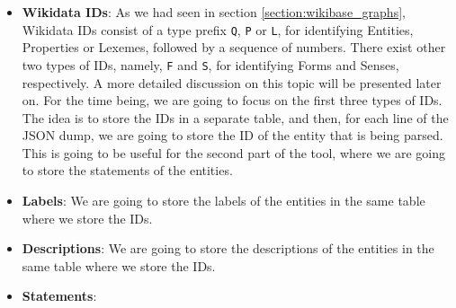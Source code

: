 \begin{itemize}
    \itemsep0.5em
    \item \textbf{Wikidata IDs}: As we had seen in section \ref{section:wikibase_graphs}, Wikidata IDs consist of a type prefix \texttt{Q}, \texttt{P} or \texttt{L}, for identifying Entities, Properties or Lexemes, followed by a sequence of numbers. There exist other two types of IDs, namely, \texttt{F} and \texttt{S}, for identifying Forms and Senses, respectively. A more detailed discussion on this topic will be presented later on. For the time being, we are going to focus on the first three types of IDs. The idea is to store the IDs in a separate table, and then, for each line of the JSON dump, we are going to store the ID of the entity that is being parsed. This is going to be useful for the second part of the tool, where we are going to store the statements of the entities.
    \item \textbf{Labels}: We are going to store the labels of the entities in the same table where we store the IDs.
    \item \textbf{Descriptions}: We are going to store the descriptions of the entities in the same table where we store the IDs.
    \item \textbf{Statements}:
\end{itemize}